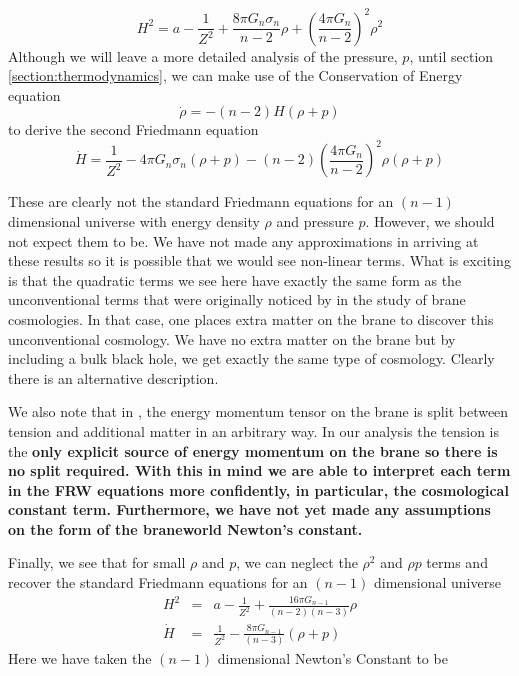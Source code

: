 \documentclass[a4paper,12pt]{article}
\begin{document}
\begin{equation} \label{eqn:FRWft:a}
H^2= a - \frac{1}{Z^2} + \frac{8 \pi G_n \sigma_n}{n-2} \rho + \left (
\frac{4 \pi G_n}{n-2} \right)^2 \rho^2
\end{equation}
Although we will leave a more detailed analysis of the pressure, $p$,
until section \ref{section:thermodynamics}, we can make use of the
Conservation of Energy equation
\begin{equation}
\dot{\rho}=-(n-2)H(\rho+p)
\end{equation}
to derive the second Friedmann equation
\begin{equation} \label{eqn:FRWft:b}
\dot{H}=\frac{1}{Z^2}-4 \pi G_n \sigma_n (\rho+p) -(n-2)\left (
\frac{4 \pi G_n}{n-2} \right)^2\rho  (\rho+p)
\end{equation}

These are clearly not the standard Friedmann equations for an $(n-1)$
dimensional universe with energy density $\rho$ and pressure
$p$. However, we should not expect them to be. We have not made any
approximations in arriving at these results so it is possible that we
would see non-linear terms. What is exciting is that the quadratic
terms we see here have exactly the same form as the unconventional
terms that were originally noticed by
\cite{Binetruy:branecos1,Binetruy:branecos2} in the study of brane
cosmologies. In that case, one places extra matter on the brane to
discover this unconventional cosmology. We have no extra matter on the
brane but by including a bulk black hole, we get exactly the same type
of cosmology. Clearly there is an alternative description.

We also note that in \cite{Binetruy:branecos1,Binetruy:branecos2}, the
energy momentum tensor on the brane is split between tension and
additional matter in an arbitrary way.  In our analysis the tension is
the \bf {only} \rm explicit source of energy momentum on the brane so
there is no split required.  With this in mind we are able to
interpret each term in the FRW equations more confidently, in
particular, the cosmological constant term.  Furthermore, we have not
yet  made any assumptions on the form of the braneworld Newton's
constant.

Finally, we see that for small $\rho$ and $p$, we can neglect the
$\rho^2$ and $\rho p$  terms and recover the standard Friedmann
equations for an $(n-1)$ dimensional universe
\begin{eqnarray}
H^2 &=& a - \frac{1}{Z^2} + \frac{16 \pi G_{n-1}}{(n-2)(n-3)} \rho
\label{eqn:linearFRW:a} \\
\dot{H} &=& \frac{1}{Z^2}- \frac{8 \pi G_{n-1}}{(n-3)} (\rho+p)
\label{eqn:linearFRW:b}
\end{eqnarray}
Here we have taken the $(n-1)$ dimensional Newton's Constant to be
\end{document}
